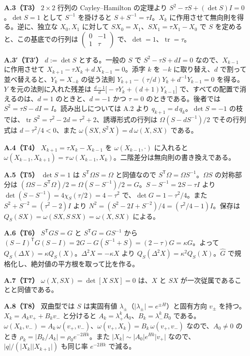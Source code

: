 \documentclass[
  a4paper,
]{ltjsarticle}
\begin{document}
\textbf{A.3（T3）} \(2\times2\) 行列の Cayley--Hamilton の定理より
\(S^2-\tau S+(\det S)I=0\)。\(\det S=1\) として \(S^{-1}\) を掛けると
\(S+S^{-1}=\tau I\)。\(X_k\) に作用させて無向則を得る。逆に、独立な
\(X_0,X_1\) に対して \(SX_0=X_1\)、\(SX_1=\tau X_1-X_0\) で \(S\)
を定めると、この基底での行列は
\(\begin{pmatrix}0&-1\\1&\tau\end{pmatrix}\)
で、\(\det=1\)、\(\operatorname{tr}=\tau\)。

\textbf{A.3′（T3′）} \(d:=\det S\) とする。一般の \(S\) で
\(S^2-\tau S+dI=0\) なので、\(X_{k-1}\) に作用させて
\(X_{k+1}-\tau X_k+d\,X_{k-1}=0\)。添字 \(k\) を \(-k\)
に取り替え、\(d\) で割って並べ替えると、\(Y_k=X_{-k}\) の従う法則
\(Y_{k+1}-(\tau/d)Y_k+d^{-1}Y_{k-1}=0\) を得る。\(Y\)
を元の法則に入れた残差は
\(\frac{d-1}{d}\bigl[-\tau Y_k+(d+1)Y_{k-1}\bigr]\)
で、すべての配置で消えるのは、\(d=1\) のときと、\(d=-1\) かつ \(\tau=0\)
のときである。後者では \(S^2=\tau S-dI=I\)。読み出しについては A.2 より
\(q_{k+1}=d\,q_k\)。\(\det S=-1\)
の枝では、\(\operatorname{tr}S^2=\tau^2-2d=\tau^2+2\)、誘導形式の行列は
\(\Omega(S-dS^{-1})/2\) でその行列式は \(d-\tau^2/4<0\)、また
\(\omega(SX,S^2X)=d\,\omega(X,SX)\) である。

\textbf{A.4（T4）} \(X_{k+1}=\tau X_k-X_{k-1}\) を
\(\omega(X_{k-1},\cdot)\) に入れると
\(\omega(X_{k-1},X_{k+1})=\tau\,\omega(X_{k-1},X_k)\)。二階差分は無向則の書き換えである。

\textbf{A.5（T5）} \(\det S=1\) は \(S^{\mathsf T}\Omega S=\Omega\)
と同値なので \(S^{\mathsf T}\Omega=\Omega S^{-1}\)。\(\Omega S\)
の対称部分は
\((\Omega S-S^{\mathsf T}\Omega)/2=\Omega(S-S^{-1})/2=G\)。\(S-S^{-1}=2S-\tau I\)
より \(\det(S-S^{-1})=4\chi_S(\tau/2)=4-\tau^2\)
で、\(\det G=1-\tau^2/4\)。また \(S^2+S^{-2}=(\tau^2-2)I\) より
\(N^2=(S^2-2I+S^{-2})/4=(\tau^2/4-1)I\)。保存は
\(Q_S(SX)=\omega(SX,S\,SX)=\omega(X,SX)\) による。

\textbf{A.6（T6）} \(S^{\mathsf T}GS=G\) と \(S^{\mathsf T}G=GS^{-1}\)
から
\((S-I)^{\mathsf T}G(S-I)=2G-G(S^{-1}+S)=(2-\tau)G=\kappa G\)。よって
\(Q_S(\Delta X)=\kappa Q_S(X)\)。\(\Delta^2X=-\kappa X\) より
\(Q_S(\Delta^2X)=\kappa^2Q_S(X)\)。\(\hat G\)
で規格化し、絶対値の平方根を取って比を作る。

\textbf{A.7（T7）} \(\omega(X,SX)=\det[X\ SX]=0\) は、\(X\) と \(SX\)
が一次従属であることと同値である。

\textbf{A.8（T8）} 双曲型では \(S\) は実固有値
\(\lambda_\pm\)（\(\lvert\lambda_\pm\rvert=e^{\pm H}\)）と固有方向
\(v_\pm\) を持つ。\(X_k=A_kv_++B_kv_-\) と分けると
\(A_k=\lambda_+^kA_0\)、\(B_k=\lambda_-^kB_0\)
である。\(\omega(X_k,v_-)=A_k\,\omega(v_+,v_-)\)、\(\omega(v_+,X_k)=B_k\,\omega(v_+,v_-)\)
なので、\(A_0\neq0\) のとき
\(\rho_k=\lvert B_k/A_k\rvert=\rho_0e^{-2Hk}\)。また
\(\lvert X_k\rvert\sim\lvert A_0\rvert e^{Hk}\lvert v_+\rvert\)
なので、\(\lvert q\rvert/(\lvert X_k\rvert\lvert X_{k+1}\rvert)\)
も同じ率 \(e^{-2Hk}\) で減る。
\end{document}
